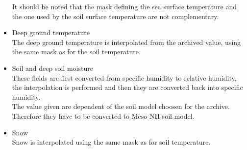 \begin{itemize}
It should be noted that the mask defining the sea surface temperature and the one used
by the soil surface temperature are not complementary.
\item Deep ground temperature\\
The deep ground temperature is interpolated from the archived value, using the same mask
as for the soil temperature.
\item Soil and deep soil moisture\\
These fields are first converted from specific humidity to relative humidity, the
interpolation is performed and then they are converted back into specific humidity.\\
The value given are dependent of the soil model choosen for the archive. Therefore they
have to be converted to Meso-NH soil model.
\item Snow\\
Snow is interpolated using the same mask as for soil temperature.
\end{itemize}



